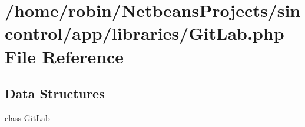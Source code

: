 \hypertarget{_git_lab_8php}{}\section{/home/robin/\+Netbeans\+Projects/sincontrol/app/libraries/\+Git\+Lab.php File Reference}
\label{_git_lab_8php}
\subsection*{Data Structures}
\begin{DoxyCompactItemize}
\item 
class \hyperlink{class_git_lab}{Git\+Lab}
\end{DoxyCompactItemize}
